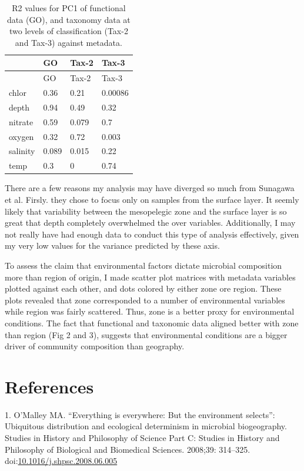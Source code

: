 \documentclass[12pt,a4paper,]{article}
\begin{document}
\begin{longtable}[]{@{}llll@{}}
\caption{R2 values for PC1 of functional data (GO), and taxonomy data at
two levels of classification (Tax-2 and Tax-3) against metadata.
\label{tbl:r2}}\tabularnewline
\toprule
& GO & Tax-2 & Tax-3\tabularnewline
\midrule
\endfirsthead
\toprule
& GO & Tax-2 & Tax-3\tabularnewline
\midrule
\endhead
chlor & 0.36 & 0.21 & 0.00086\tabularnewline
depth & 0.94 & 0.49 & 0.32\tabularnewline
nitrate & 0.59 & 0.079 & 0.7\tabularnewline
oxygen & 0.32 & 0.72 & 0.003\tabularnewline
salinity & 0.089 & 0.015 & 0.22\tabularnewline
temp & 0.3 & 0 & 0.74\tabularnewline
\bottomrule
\end{longtable}

There are a few reasons my analysis may have diverged so much from
Sunagawa et al. Firsly. they chose to focus only on samples from the
surface layer. It seemly likely that variability between the mesopelegic
zone and the surface layer is so great that depth completely overwhelmed
the over variables. Additionally, I may not really have had enough data
to conduct this type of analysis effectively, given my very low values
for the variance predicted by these axis.

To assess the claim that environmental factors dictate microbial
composition more than region of origin, I made scatter plot matrices
with metadata variables plotted against each other, and dots colored by
either zone ore region. These plots revealed that zone corresponded to a
number of environmental variables while region was fairly scattered.
Thus, zone is a better proxy for environmental conditions. The fact that
functional and taxonomic data aligned better with zone than region (Fig
2 and 3), suggests that environmental conditions are a bigger driver of
community composition than geography.

\section{References}\label{references}

\hypertarget{refs}{}
\hypertarget{ref-omalley_everything_2008}{}
1. O'Malley MA. ``Everything is everywhere: But the environment
selects'': Ubiquitous distribution and ecological determinism in
microbial biogeography. Studies in History and Philosophy of Science
Part C: Studies in History and Philosophy of Biological and Biomedical
Sciences. 2008;39: 314--325.
doi:\href{https://doi.org/10.1016/j.shpsc.2008.06.005}{10.1016/j.shpsc.2008.06.005}
\end{document}
